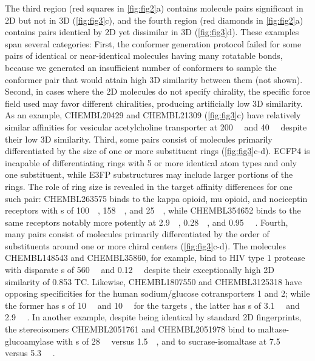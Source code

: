 \documentclass[../main.tex]{subfiles}
\begin{document}
\begin{refsection}
The third region (red squares in \cref{fig:fig2}a) contains molecule pairs significant in 2D but not in 3D (\cref{fig:fig3}c), and the fourth region (red diamonds in \cref{fig:fig2}a) contains pairs identical by 2D yet dissimilar in 3D (\cref{fig:fig3}d).
These examples span several categories: First, the conformer generation protocol failed for some pairs of identical or near-identical molecules having many rotatable bonds, because we generated an insufficient number of conformers to sample the conformer pair that would attain high 3D similarity between them (not shown).
Second, in cases where the 2D molecules do not specify chirality, the specific force field used may favor different chiralities, producing artificially low 3D similarity.
As an example, CHEMBL20429 and CHEMBL21309 (\cref{fig:fig3}c) have relatively similar affinities for vesicular acetylcholine transporter at \SI{200}{\nano\molar} and \SI{40}{\nano\molar} \cite{rogers_1989} despite their low 3D similarity.
Third, some pairs consist of molecules primarily differentiated by the size of one or more substituent rings (\cref{fig:fig3}c-d).
ECFP4 is incapable of differentiating rings with 5 or more identical atom types and only one substituent, while E3FP substructures may include larger portions of the rings.
The role of ring size is revealed in the target affinity differences for one such pair: CHEMBL263575 binds to the kappa opioid, mu opioid, and nociceptin receptors with \Ki s of \SI{100}{\nano\molar}, \SI{158}{\nano\molar}, and \SI{25}{\nano\molar}, while CHEMBL354652 binds to the same receptors notably more potently at \SI{2.9}{\nano\molar},  \SI{0.28}{\nano\molar}, and \SI{0.95}{\nano\molar} \cite{rver_2000}.
Fourth, many pairs consist of molecules primarily differentiated by the order of substituents around one or more chiral centers (\cref{fig:fig3}c-d).
The molecules CHEMBL148543 and  CHEMBL35860, for example, bind to HIV type 1 protease with disparate  \Ki s of \SI{560}{\nano\molar} \cite{kaltenbach_1998} and \SI{0.12}{\nano\molar} \cite{lam_1996} despite their exceptionally high 2D similarity of 0.853 TC.
Likewise, CHEMBL1807550 and CHEMBL3125318 have opposing specificities for the human sodium/glucose cotransporters 1 and 2; while the former has  \ICfifty s of \SI{10}{\nano\molar} and \SI{10}{\micro\molar} for the targets  \cite{xu_2011}, the latter has \ICfifty s of \SI{3.1}{\micro\molar}  and \SI{2.9}{\nano\molar} \cite{xu_2014}.
In another example, despite being identical by standard 2D fingerprints, the stereoisomers CHEMBL2051761 and CHEMBL2051978 bind to maltase-glucoamylase with  \ICfifty s of \SI{28}{\nano\molar} versus \SI{1.5}{\micro\molar}, and to sucrase-isomaltase at \SI{7.5}{\nano\molar} versus \SI{5.3}{\micro\molar} \cite{horii_1986}.

\end{refsection}
\end{document}
